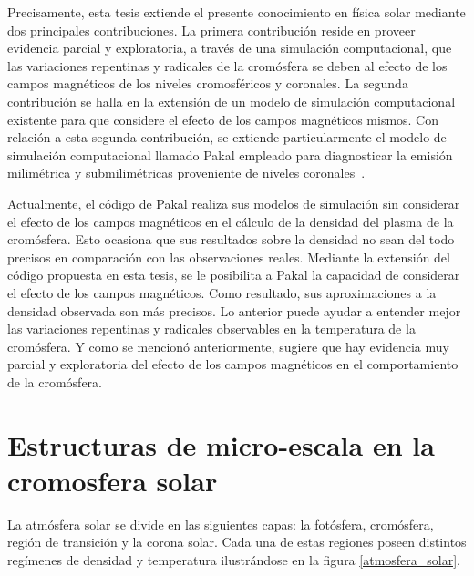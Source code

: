 \documentclass[9pt]{book}
\begin{document}
Precisamente, esta tesis extiende el presente conocimiento en f\'isica solar mediante dos principales contribuciones. La primera contribuci\'on reside en proveer evidencia parcial y exploratoria, a trav\'es de una simulaci\'on computacional,  que las variaciones repentinas y radicales de la crom\'osfera se deben al efecto de los campos magn\'eticos de los niveles cromosf\'ericos y coronales. La segunda contribuci\'on se halla en la extensi\'on de un modelo de simulaci\'on computacional existente para que considere el efecto de los campos magn\'eticos mismos. Con relaci\'on a esta segunda contribuci\'on, se extiende particularmente el modelo de simulaci\'on computacional llamado Pakal empleado para diagnosticar la emisi\'on milim\'etrica y submilim\'etricas proveniente de niveles coronales~\cite{2010ApJS..188..437D}.

Actualmente, el c\'odigo de Pakal realiza sus modelos de simulaci\'on sin considerar el efecto de los campos magn\'eticos en el c\'alculo de la densidad del plasma de la crom\'osfera. Esto ocasiona que sus resultados sobre la densidad no sean del todo precisos en comparaci\'on con las observaciones reales. Mediante la extensi\'on del c\'odigo propuesta en esta tesis, se le posibilita a Pakal la capacidad de considerar el efecto de los campos magn\'eticos. Como resultado, sus aproximaciones a la densidad observada son m\'as precisos. Lo anterior puede ayudar a entender mejor las variaciones repentinas y radicales observables en la temperatura de la crom\'osfera. Y como se mencion\'o anteriormente, sugiere que hay evidencia muy parcial y exploratoria del efecto de los campos magn\'eticos en el comportamiento de la crom\'osfera.



\chapter{Estructuras de micro-escala en la cromosfera solar}

La atm\'osfera solar se divide en las siguientes capas: la fot\'osfera, crom\'osfera, regi\'on de transici\'on y la corona solar. Cada una de estas regiones poseen distintos reg\'imenes de densidad y temperatura ilustr\'andose en la figura \ref{atmosfera_solar}.
\end{document}
